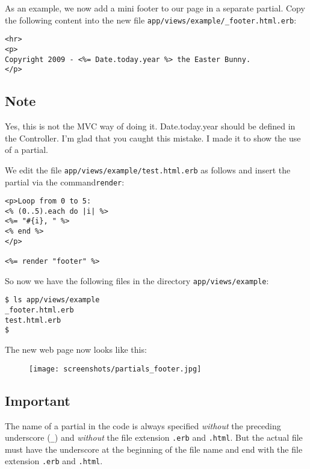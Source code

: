 \documentclass[a4paper]{book}
\begin{document}
As an example, we now add a mini footer to our page in a separate partial. Copy the following content into the new file \texttt{app/views/example/\_footer.html.erb}:

\begin{shaded}\begin{verbatim}
<hr>
<p>
Copyright 2009 - <%= Date.today.year %> the Easter Bunny.
</p>
\end{verbatim}\end{shaded}

\subsection{Note}\label{note-16}

Yes, this is not the MVC way of doing it. Date.today.year should be defined in the Controller. I'm glad that you caught this mistake. I made it to show the use of a partial.

We edit the file \texttt{app/views/example/test.html.erb} as follows and insert the partial via the command\texttt{render}:

\begin{shaded}\begin{verbatim}
<p>Loop from 0 to 5:
<% (0..5).each do |i| %>
<%= "#{i}, " %>
<% end %>
</p>

<%= render "footer" %>
\end{verbatim}\end{shaded}

So now we have the following files in the directory \texttt{app/views/example}:

\begin{shaded}\begin{verbatim}
$ ls app/views/example
_footer.html.erb
test.html.erb
$
\end{verbatim}\end{shaded}

The new web page now looks like this:

\begin{figure}[htbp]
\centering
\texttt{[image: screenshots/partials\_footer.jpg]}
\end{figure}

\subsection{Important}\label{important-7}

The name of a partial in the code is always specified \emph{without} the preceding underscore (\texttt{\_}) and \emph{without} the file extension \texttt{.erb} and \texttt{.html}. But the actual file must have the underscore at the beginning of the file name and end with the file extension \texttt{.erb} and \texttt{.html}.
\end{document}
